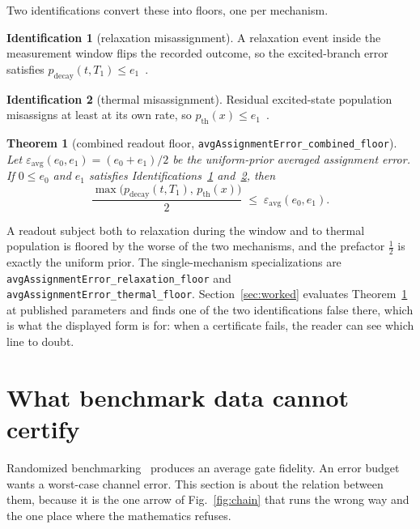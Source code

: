 \documentclass[aps,pra,reprint,nofootinbib,superscriptaddress]{revtex4-2}
\theoremstyle{plain}
\newtheorem{theorem}{Theorem}
\theoremstyle{definition}
\newtheorem{hypothesis}{Identification}
\theoremstyle{remark}
\newcommand{\lean}[1]{\texttt{#1}}
\begin{document}
Two identifications convert these into floors, one per mechanism.

\begin{hypothesis}[relaxation misassignment]
\label{id:relax}
A relaxation event inside the measurement window flips the recorded
outcome, so the excited-branch error satisfies
$p_{\mathrm{decay}}(t,T_1) \le e_1$~\cite{Gambetta2007,Walter2017,Geerlings2013}.
\end{hypothesis}

\begin{hypothesis}[thermal misassignment]
\label{id:therm}
Residual excited-state population misassigns at least at its own rate, so
$p_{\mathrm{th}}(x) \le e_1$~\cite{Jin2015,Geerlings2013}.
\end{hypothesis}

\begin{theorem}[combined readout floor,
\lean{avgAssignmentError\_combined\_floor}]
\label{thm:combined}
Let $\varepsilon_{\mathrm{avg}}(e_0,e_1) = (e_0+e_1)/2$ be the
uniform-prior averaged assignment error. If $0 \le e_0$ and $e_1$
satisfies Identifications~\ref{id:relax} and~\ref{id:therm}, then
\[
\frac{\max\big(p_{\mathrm{decay}}(t,T_1),\, p_{\mathrm{th}}(x)\big)}{2}
\;\le\; \varepsilon_{\mathrm{avg}}(e_0,e_1).
\]
\end{theorem}

A readout subject both to relaxation during the window and to thermal
population is floored by the worse of the two mechanisms, and the
prefactor $\tfrac12$ is exactly the uniform prior. The single-mechanism
specializations are \lean{avgAssignmentError\_relaxation\_floor} and
\lean{avgAssignmentError\_thermal\_floor}. Section~\ref{sec:worked}
evaluates Theorem~\ref{thm:combined} at published parameters and finds
one of the two identifications false there, which is what the displayed
form is for: when a certificate fails, the reader can see which line to
doubt.

\section{What benchmark data cannot certify}
\label{sec:rb}

Randomized benchmarking~\cite{Magesan2011} produces an average gate
fidelity. An error budget wants a worst-case channel error. This section
is about the relation between them, because it is the one arrow of
Fig.~\ref{fig:chain} that runs the wrong way and the one place where the
mathematics refuses.
\end{document}
